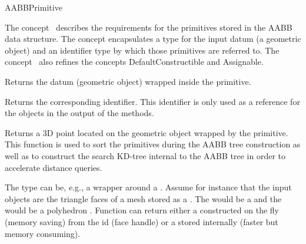 \ccRefPageBegin


\begin{ccRefConcept}{AABBPrimitive}


\ccDefinition
  
The concept \ccRefName\ describes the requirements for the primitives stored in the AABB data structure. The concept encapsulates a type for the input datum (a geometric object) and an identifier type by which those primitives are referred to. The concept \ccRefName\ also refines the concepts DefaultConstructible and Assignable.

\ccTypes






\ccOperations

{Returns the datum (geometric object) wrapped inside the primitive.}

{Returns the corresponding identifier. This identifier is only used as a reference for the objects in the output of the  methods.}

{Returns a 3D point located on the geometric object wrapped by the primitive. This function is used to sort the primitives during the AABB tree construction as well as to construct the search KD-tree internal to the AABB tree in order to accelerate distance queries.}

\ccSeeAlso
{}

\ccExample

The  type can be, e.g., a wrapper around a . Assume for instance that the input objects are the triangle faces of a mesh stored as a . The  would be a  and the  would be a polyhedron . Function  can return either a  constructed on the fly (memory saving) from the id (face handle) or a  stored internally (faster but memory consuming). 

\end{ccRefConcept}

\ccRefPageEnd

